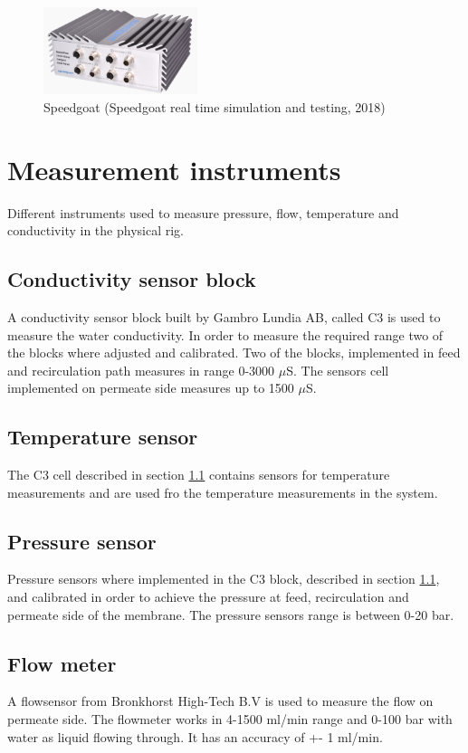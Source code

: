 \begin{figure}[h]
    \centering
    \includegraphics[width=0.4\textwidth]{Speedgoat}
    \caption{Speedgoat (Speedgoat real time simulation and testing, 2018)}
    \label{fig:speedgoat}
\end{figure}

\section{Measurement instruments} 
\label{measure}
Different instruments used to measure pressure, flow, temperature and conductivity in the physical rig.

\subsection{Conductivity sensor block}
\label{senscond}
A conductivity sensor block built by Gambro Lundia AB, called C3 is used to measure the water conductivity. In order to measure the required range two of the blocks where adjusted and calibrated. Two of the blocks, implemented in feed and recirculation path measures in range 0-3000 $\mu$S. The sensors cell implemented on permeate side measures up to 1500 $\mu$S.

\subsection{Temperature sensor}
\label{senstemp}
The C3 cell described in section \ref{senscond} contains sensors for temperature measurements and are used fro the temperature measurements in the system.

\subsection{Pressure sensor}
\label{senspress}
Pressure sensors where implemented in the C3 block, described in section \ref{senscond}, and calibrated in order to achieve the pressure at feed, recirculation and permeate side of the membrane. The pressure sensors range is between 0-20 bar.


\subsection{Flow meter}
\label{sensflow}
A flowsensor from Bronkhorst High-Tech B.V is used to measure the flow on permeate side. The flowmeter works in 4-1500 ml/min range and 0-100 bar with water as liquid flowing through. It has an accuracy of +- 1 ml/min. 

